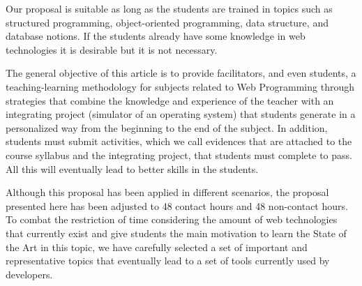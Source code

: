 Our proposal is suitable as long as the students are trained in topics such as 
structured programming, object-oriented programming, data structure, and database 
notions. If the students already have some knowledge in web technologies it is 
desirable but it is not necessary.

The general objective of this article is to provide facilitators, and even students, 
a teaching-learning methodology for subjects related to Web Programming through 
strategies that combine the knowledge and experience of the teacher with an 
integrating project (simulator of an operating system) that students generate in a 
personalized way from the beginning to the end of the subject. In addition, students 
must submit activities, which we call evidences that are attached to the course 
syllabus and the integrating project, that students must complete to pass. All this 
will eventually lead to better skills in the students.

Although this proposal has been applied in different scenarios, the proposal 
presented here has been adjusted to 48 contact hours and 48 non-contact hours. 
To combat the restriction of time considering the amount of web technologies that 
currently exist and give students the main motivation to learn the State of the Art 
in this topic, we have carefully selected a set of important and representative topics 
that eventually lead to a set of tools currently used by developers.



